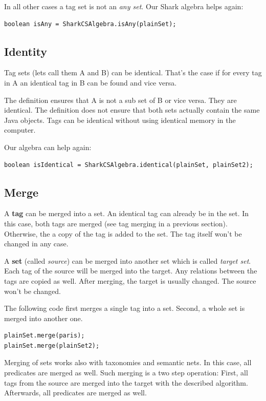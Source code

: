 In all other cases a tag set is not an {\it any set}. Our Shark algebra helps again:

\begin{verbatim}
boolean isAny = SharkCSAlgebra.isAny(plainSet);
\end{verbatim}

\subsection{Identity}

Tag sets (lets call them A and B) can be identical. That's the case if for every tag in A an identical tag in B can be found and vice versa.

The definition ensures that A is not a sub set of B or vice versa. They are identical. The definition does not ensure that both sets actually contain the same Java objects. Tags can be identical without using identical memory in the computer.

Our algebra can help again:

\begin{verbatim}
boolean isIdentical = SharkCSAlgebra.identical(plainSet, plainSet2);
\end{verbatim}

\subsection{Merge}
A {\bf tag} can be merged into a set. An identical tag can already be in the set. In this case, both tags are merged (see tag merging in a previous section). Otherwise, the a copy of the tag is added to the set. The tag itself won't be changed in any case.

A {\bf set} (called {\it source}) can be merged into another set which is called {\it target set}. Each tag of the source will be merged into the target. Any relations between the tags are copied as well. After merging, the target is usually changed. The source won't be changed.

The following code first merges a single tag into a set. Second, a whole set is merged into another one.

\begin{verbatim}
plainSet.merge(paris);
plainSet.merge(plainSet2);
\end{verbatim}

Merging of sets works also with taxonomies and semantic nets. In this case, all predicates are merged as well. Such merging is a two step operation: First, all tags from the source are merged into the target with the described algorithm. Afterwards, all predicates are merged as well.

